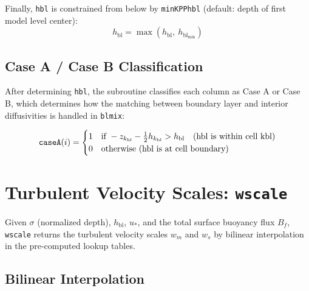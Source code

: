 \documentclass[12pt,letterpaper]{article}
\newcommand{\hbl}{h_{\mathrm{bl}}}
\newcommand{\ustar}{u_*}
\newcommand{\wm}{w_m}
\newcommand{\ws}{w_s}
\newcommand{\bfsfc}{B_f}
\begin{document}
Finally, \texttt{hbl} is constrained from below by \texttt{minKPPhbl}  
(default: depth of first model level center):  
\begin{equation}  
\hbl = \max(\hbl,\ \hbl_{\min})  
\end{equation}  
  
\subsection{Case A / Case B Classification}  
  
After determining \texttt{hbl}, the subroutine classifies each column  
as Case A or Case B, which determines how the matching between boundary  
layer and interior diffusivities is handled in \texttt{blmix}:  
  
\begin{equation}  
\texttt{caseA}(i) = \begin{cases}  
1 & \text{if } -z_{k_{\rm bl}} - \tfrac{1}{2}h_{k_{\rm bl}} > \hbl  
    \quad \text{(hbl is within cell kbl)} \\  
0 & \text{otherwise (hbl is at cell boundary)}  
\end{cases}  
\end{equation}  
  
\section{Turbulent Velocity Scales: \texttt{wscale}}  
  
Given $\sigma$ (normalized depth), $\hbl$, $\ustar$, and the total  
surface buoyancy flux $\bfsfc$, \texttt{wscale} returns the turbulent  
velocity scales $\wm$ and $\ws$ by bilinear interpolation in the  
pre-computed lookup tables.  
  
\subsection{Bilinear Interpolation}  
  
\end{document}
